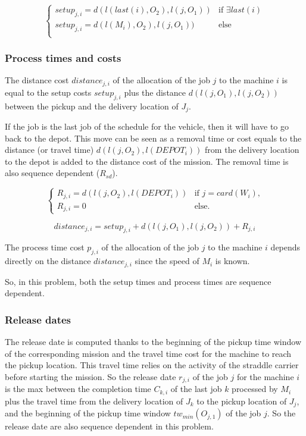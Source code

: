 \documentclass[a4paper,10pt]{article}
\begin{document}
\begin{equation*}
 \begin{cases}
  setup_{j, i} = d(l(last(i),O_2),l(j,O_1)) & \text{if $\exists last(i)$}\\
  setup_{j, i} = d(l(M_i),O_2),l(j,O_1)) & \text{else}\\
 \end{cases}
\end{equation*}

\subsubsection{Process times and costs}

The distance cost $distance_{j, i}$ of the allocation of the job $j$ to the machine $i$ is equal to the setup costs $setup_{j, i}$ plus the distance $d(l(j,O_1), l(j,O_2))$ between the pickup and the delivery location of $J_j$.

If the job is the last job of the schedule for the vehicle, then it will have to go back to the depot. This move can be seen as a removal time or cost equals to the distance (or travel time) $d(l(j,O_2),l(DEPOT_{i}))$ from the delivery location to the depot is added to the distance cost of the mission. The removal time is also sequence dependent ($R_{sd}$).

\begin{equation*}
\begin{cases}
 R_{j, i} = d(l(j,O_2),l(DEPOT_{i})) & \text{if $j = card(W_{i})$,} \\
 R_{j, i} = 0 & \text{else.}
\end{cases}
\end{equation*}

\begin{equation*}
  distance_{j,i} = setup_{j, i} + d(l(j,O_1), l(j,O_2)) + R_{j,i}
\end{equation*}

The process time cost $p_{j, i}$ of the allocation of the job $j$ to the machine $i$ depends directly on the distance $distance_{j,i}$ since the speed of $M_i$ is known.

So, in this problem, both the setup times and process times are sequence dependent.


\subsubsection{Release dates}
The release date is computed thanks to the beginning of the pickup time window of the corresponding mission and the travel time cost for the machine to reach the pickup location. This travel time relies on the activity of the straddle carrier before starting the mission. So the release date $r_{j,i}$ of the job $j$ for the machine $i$ is the max between the completion time $C_{k,i}$ of the last job $k$  processed by $M_i$ plus the travel time from the delivery location of $J_k$ to the pickup location of $J_j$, and the beginning of the pickup time window $tw_{min}(O_{j,1})$ of the job $j$. So the release date are also sequence dependent in this problem.
\end{document}
